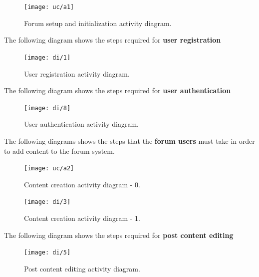 \documentclass[12pt]{report}
\renewcommand\emph{\textbf}
\begin{document}
                \begin{figure}[H]
                \caption{Forum setup and initialization activity diagram.}
                \centering
                \texttt{[image: uc/a1]}
                \end{figure}

                \newpage

                The following diagram shows the steps required for \emph{user registration}

                \begin{figure}[H]
                \caption{User registration activity diagram.}
                \centering
                \texttt{[image: di/1]}
                \end{figure}

                \newpage

                The following diagram shows the steps required for \emph{user authentication}

                \begin{figure}[H]
                \caption{User authentication activity diagram.}
                \centering
                \texttt{[image: di/8]}
                \end{figure}

                \newpage

                The following diagrams shows the steps that the \emph{forum users} must take in order to add content to the forum system.

                \begin{figure}[H]
                \caption{Content creation activity diagram - 0.}
                \centering
                \texttt{[image: uc/a2]}
                \end{figure}

                \begin{figure}[H]
                \caption{Content creation activity diagram - 1.}
                \centering
                \texttt{[image: di/3]}
                \end{figure}

                \newpage

                The following diagram shows the steps required for \emph{post content editing}

                \begin{figure}[H]
                \caption{Post content editing activity diagram.}
                \centering
                \texttt{[image: di/5]}
                \end{figure}
\end{document}
